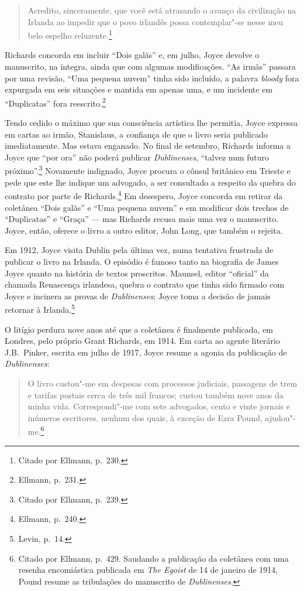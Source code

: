 \begin{quote}
Acredito, sinceramente, que você está atrasando o avanço da civilização na Irlanda ao 
impedir que o povo irlandês possa contemplar"-se nesse meu belo espelho reluzente.\footnote{ Citado por
Ellmann, p.~230.} 
\end{quote}

Richards concorda em incluir “Dois galãs” e, em julho, Joyce
devolve o manuscrito, na íntegra, ainda que com algumas modificações. “As
irmãs” passara por uma revisão, “Uma pequena nuvem” tinha sido incluído, a
palavra \textit{bloody} fora expurgada em seis situações e mantida em apenas
uma, e um incidente em “Duplicatas” fora reescrito.\footnote{ Ellmann, p.~231.}

Tendo cedido o máximo que sua consciência artística lhe permitia, Joyce expressa
em cartas ao irmão, Stanislaus, a confiança de que o livro seria publicado
imediatamente. Mas estava enganado. No final de setembro, Richards informa a
Joyce que “por ora” não poderá publicar \textit{Dublinenses}, “talvez num futuro
próximo”.\footnote{ Citado por Ellmann, p.~239.} Novamente indignado, Joyce procura o
cônsul britânico em Trieste e pede que este lhe indique um advogado, a ser
consultado a respeito da quebra do contrato por parte de Richards.\footnote{ Ellmann, p.~240.} 
Em desespero, Joyce concorda em retirar da coletânea “Dois galãs” e “Uma
pequena nuvem” e em modificar dois trechos de “Duplicatas” e “Graça” --- mas
Richards recusa mais uma vez o manuscrito. Joyce, então, oferece o livro a
outro editor, John Long, que também o rejeita.

Em 1912, Joyce visita Dublin pela última vez, numa tentativa frustrada de
publicar o livro na Irlanda. O episódio é famoso tanto na biografia de James
Joyce quanto na história de textos proscritos. Maunsel, editor “oficial” da
chamada Renascença irlandesa, quebra o contrato que tinha sido firmado com
Joyce e incinera as provas de \textit{Dublinenses}; Joyce toma a decisão de
jamais retornar à Irlanda.\footnote{ Levin, p.~14.}

O litígio perdura nove anos até que a coletânea é finalmente publicada, em
Londres, pelo próprio Grant Richards, em 1914. Em carta ao agente literário J.B.~Pinker,
escrita em julho de 1917, Joyce resume a agonia da publicação de
\textit{Dublinenses}: 

\begin{quote}
O livro custou"-me em despesas com processos judiciais,
passagens de trem e tarifas postais cerca de três mil francos; custou também
nove anos da minha vida.  Correspondi"-me com sete advogados, cento e vinte
jornais e inúmeros escritores, nenhum dos quais, à exceção de Ezra Pound,
ajudou"-me.\footnote{  Citado por Ellmann, p.~429. Saudando a publicação da
coletânea com uma resenha encomiástica publicada em \textit{The
Egoist} de 14 de janeiro de 1914, Pound resume as tribulações do
manuscrito de \textit{Dublinenses}.} 
\end{quote}

